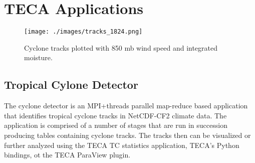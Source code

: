 \documentclass[a4paper,10pt,DIV=12]{scrreprt}
\begin{document}
%
%
%
\chapter{TECA Applications}
\begin{figure}[t]
 \centering
 \texttt{[image: ./images/tracks\_1824.png]}
 \caption{Cyclone tracks plotted with 850 mb wind speed and integrated moisture.}
 \label{fig:candidates_and_tracks}
\end{figure}

\section{Tropical Cylone Detector}
The cyclone detector is an MPI+threads parallel map-reduce based application that identifies tropical cyclone tracks in NetCDF-CF2 climate data. The application is comprised of a number of stages that are run in succession producing tables containing cyclone tracks. The tracks then can be visualized or further analyzed using the TECA TC statistics application, TECA's Python bindings, ot the TECA ParaView plugin.
\end{document}
